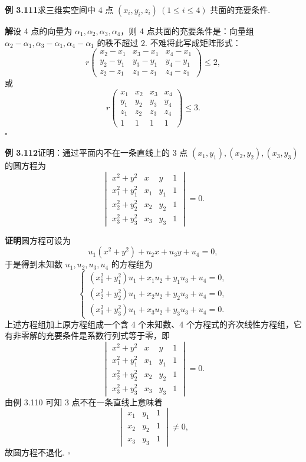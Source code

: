 \documentclass[UTF8,12pt,a4paper,fontset=fandol]{ctexart}
\begin{document}
\noindent\textbf{例 3.111}\quad 求三维实空间中 4 点 $(x_i,y_i,z_i)\ (1\le i\le 4)$ 共面的充要条件.

\noindent\textbf{解}\quad 设 4 点的向量为 $\alpha_1,\alpha_2,\alpha_3,\alpha_4$，则 4 点共面的充要条件是：向量组 $\alpha_2-\alpha_1,\alpha_3-\alpha_1,\alpha_4-\alpha_1$ 的秩不超过 2. 不难将此写成矩阵形式：
\[
r\begin{pmatrix}
x_2-x_1&x_3-x_1&x_4-x_1\\
y_2-y_1&y_3-y_1&y_4-y_1\\
z_2-z_1&z_3-z_1&z_4-z_1
\end{pmatrix}\le 2,
\]
或
\[
r\begin{pmatrix}
x_1&x_2&x_3&x_4\\
y_1&y_2&y_3&y_4\\
z_1&z_2&z_3&z_4\\
1&1&1&1
\end{pmatrix}\le 3.
\]
$\square$

\noindent\textbf{例 3.112}\quad 证明：通过平面内不在一条直线上的 3 点 $(x_1,y_1),(x_2,y_2),(x_3,y_3)$ 的圆方程为
\[
\begin{vmatrix}
x^2+y^2&x&y&1\\
x_1^2+y_1^2&x_1&y_1&1\\
x_2^2+y_2^2&x_2&y_2&1\\
x_3^2+y_3^2&x_3&y_3&1
\end{vmatrix}=0.
\]

\noindent\textbf{证明}\quad 圆方程可设为
\[
u_1(x^2+y^2)+u_2x+u_3y+u_4=0,
\]
于是得到未知数 $u_1,u_2,u_3,u_4$ 的方程组为
\[
\begin{cases}
(x_1^2+y_1^2)u_1+x_1u_2+y_1u_3+u_4=0,\\
(x_2^2+y_2^2)u_1+x_2u_2+y_2u_3+u_4=0,\\
(x_3^2+y_3^2)u_1+x_3u_2+y_3u_3+u_4=0.
\end{cases}
\]
上述方程组加上原方程组成一个含 4 个未知数、4 个方程式的齐次线性方程组，它有非零解的充要条件是系数行列式等于零，即
\[
\begin{vmatrix}
x^2+y^2&x&y&1\\
x_1^2+y_1^2&x_1&y_1&1\\
x_2^2+y_2^2&x_2&y_2&1\\
x_3^2+y_3^2&x_3&y_3&1
\end{vmatrix}=0.
\]
由例 3.110 可知 3 点不在一条直线上意味着
\[
\begin{vmatrix}
x_1&y_1&1\\
x_2&y_2&1\\
x_3&y_3&1
\end{vmatrix}\ne 0,
\]
故圆方程不退化. $\square$
\end{document}
